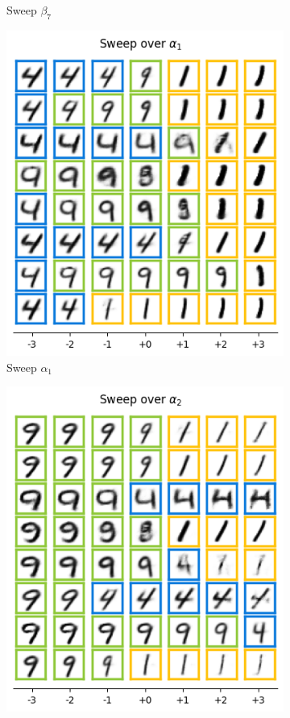 \begin{figure}[h]
\begin{subfigure}[t]{.23\linewidth}
		\caption{Sweep $\beta_7$}
	\end{subfigure}
	\caption{Visualizations of learned latent factors for MNIST classifier trained on classes '3' \& '8'}
	\label{fig:complte_:mnist_results 38}
	
	\begin{subfigure}[t]{.23\linewidth}
		\includegraphics[width=.9\textwidth]{../openreview/pictures/Figure13/alpha_1.png}
		\caption{Sweep $\alpha_1$}
	\end{subfigure}
	\begin{subfigure}[t]{.23\linewidth}
		\includegraphics[width=.9\textwidth]{../openreview/pictures/Figure13/alpha_2.png}

\end{subfigure}
\end{figure}

